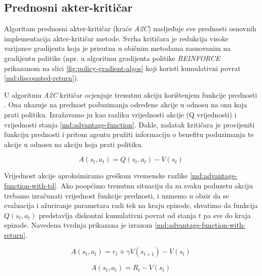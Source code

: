 

\subsection{Prednosni akter-kritičar}

Algoritam prednosni akter-kritičar  (kraće \textit{A2C}) nasljeđuje sve prednosti osnovnih implementacija akter-kritičar metode. Svrha kritičara je redukcija visoke varijance gradijenta koja je prisutna u običnim metodama zasnovanim na gradijentu politike (npr. u algoritmu gradijenta politike \textit{REINFORCE} prikazanom na slici \ref{fig:policy-gradient-algos} koji koristi kumulativni povrat \ref{md:discounted-return}). 

U algoritmu \textit{A2C} kritičar ocjenjuje trenutnu akciju korištenjem funkcije prednosti . Ona ukazuje na prednost poduzimanja određene akcije u odnosu na onu koja prati politiku. Izražavamo ju kao razliku vrijednosti akcije (Q vrijednosti) i vrijednosti stanja \ref{md:advantage-function}. Dakle, zadatak kritičara je procijeniti funkciju prednosti i pritom agentu pružiti informaciju o benefitu poduzimanja te akcije u odnosu na akciju koja prati politiku.

\begin{equation}
    \label{md:advantage-function}
    A (s_t, a_t) = Q (s_t, a_t) - V (s_t) 
\end{equation}

\bigskip

Vrijednost akcije aproksimiramo greškom vremenske razlike \ref{md:advantage-function-with-td}. Ako poopćimo trenutnu situaciju da za svaku poduzetu akciju trebamo izračunati vrijednost funkcije prednosti, i uzmemo u obzir da se evaluacija i ažuriranje parametara radi tek na kraju epizode, shvatimo da funkcija $Q (s_t, a_t)$ predstavlja diskontni kumulativni povrat od stanja $t$ pa sve do kraja epizode. Navedena tvrdnja prikazana je izrazom \ref{md:advantage-function-with-return}.

\begin{equation}
    \label{md:advantage-function-with-td}
    A (s_t, a_t) = r_t + \gamma V(s_{t+1}) - V (s_t) 
\end{equation}

\begin{equation}
    \label{md:advantage-function-with-return}
    A (s_t, a_t) = R_t - V (s_t) 
\end{equation}

